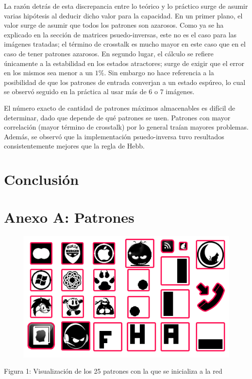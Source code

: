 \documentclass[%
    final,
    reprint,
    notitlepage,
    narroweqnarray,
    inline,
    twoside,
    invited
    ]{ieee}
\begin{document}
\par La razón detrás de esta discrepancia entre lo teórico y lo práctico surge de asumir varias hipótesis 
al deducir dicho valor para la capacidad. En un primer plano, el valor surge de asumir que todos 
los patrones son azarosos. Como ya se ha explicado en la sección de matrices psuedo-inversas, este no 
es el caso para las imágenes tratadas; el término de crosstalk es mucho mayor en 
este caso que en el caso de tener patrones azarosos. En segundo lugar, el cálculo se refiere únicamente 
a la estabilidad en los estados atractores; surge de exigir que el error en los mismos sea menor a 
un $1\%$. Sin embargo no hace referencia a la posibilidad de que los patrones de entrada 
converjan a un estado espúreo, lo cual se observó seguido en la práctica al usar más de 6 o 7 imágenes.

\par El número exacto de cantidad de patrones máximos almacenables es difícil de determinar, dado que 
depende de qué patrones se usen. Patrones con mayor correlación (mayor término de crosstalk) por lo 
general traían mayores problemas. Además, se observó que la implementación psuedo-inversa tuvo resultados 
consistentemente mejores que la regla de Hebb.



\section{Conclusión}






\clearpage
\onecolumn

\section*{Anexo A: Patrones}

\begin{figure}[H]
\begin{center}
\includegraphics[scale=0.70]{./images/patterns.png}
\label{modelado}
\end{center}
\end{figure}

\begin{center}
\par Figura 1: Visualización de los 25 patrones con la que se inicializa a la red
\end{center}



\end{document}
